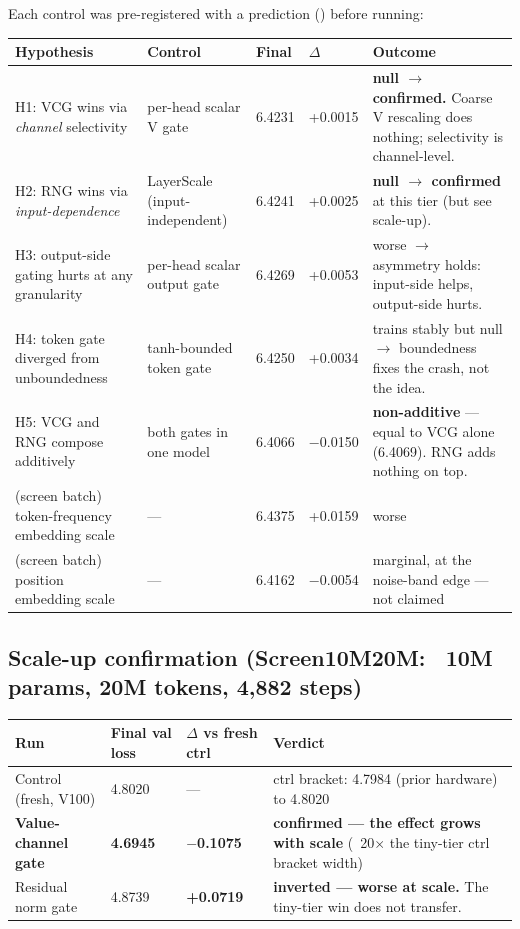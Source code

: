\documentclass[11pt,a4paper]{article}
\begin{document}
Each control was pre-registered with a prediction (\texttt{}) before running:

\begin{tabular}{lllll}
\toprule
Hypothesis & Control & Final & $\Delta$ & Outcome \\
\midrule
H1: VCG wins via \emph{channel} selectivity & per-head scalar V gate & 6.4231 & +0.0015 & \textbf{null $\rightarrow$ confirmed.} Coarse V rescaling does nothing; selectivity is channel-level. \\
H2: RNG wins via \emph{input-dependence} & LayerScale (input-independent) & 6.4241 & +0.0025 & \textbf{null $\rightarrow$ confirmed} at this tier (but see scale-up). \\
H3: output-side gating hurts at any granularity & per-head scalar output gate & 6.4269 & +0.0053 & worse $\rightarrow$ asymmetry holds: input-side helps, output-side hurts. \\
H4: token gate diverged from unboundedness & tanh-bounded token gate & 6.4250 & +0.0034 & trains stably but null $\rightarrow$ boundedness fixes the crash, not the idea. \\
H5: VCG and RNG compose additively & both gates in one model & 6.4066 & $-$0.0150 & \textbf{non-additive} --- equal to VCG alone (6.4069). RNG adds nothing on top. \\
(screen batch) token-frequency embedding scale & --- & 6.4375 & +0.0159 & worse \\
(screen batch) position embedding scale & --- & 6.4162 & $-$0.0054 & marginal, at the noise-band edge --- not claimed \\
\bottomrule
\end{tabular}

\subsection{Scale-up confirmation (Screen10M20M: ~10M params, 20M tokens, 4,882 steps)}

\begin{tabular}{llll}
\toprule
Run & Final val loss & $\Delta$ vs fresh ctrl & Verdict \\
\midrule
Control (fresh, V100) & 4.8020 & --- & ctrl bracket: 4.7984 (prior hardware) to 4.8020 \\
\textbf{Value-channel gate} & \textbf{4.6945} & \textbf{$-$0.1075} & \textbf{confirmed --- the effect grows with scale} (~20$\times$ the tiny-tier ctrl bracket width) \\
Residual norm gate & 4.8739 & \textbf{+0.0719} & \textbf{inverted --- worse at scale.} The tiny-tier win does not transfer. \\
\bottomrule
\end{tabular}
\end{document}

